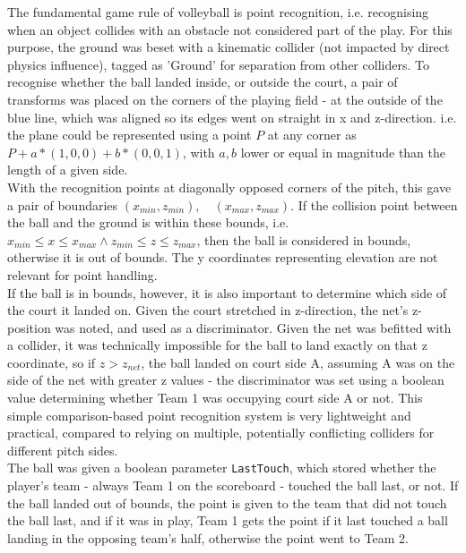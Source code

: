 The fundamental game rule of volleyball is point recognition, i.e. recognising when an object collides with an obstacle not considered part of the play. For this purpose, the ground was beset with a kinematic collider (not impacted by direct physics influence), tagged as 'Ground' for separation from other colliders. To recognise whether the ball landed inside, or outside the court, a pair of transforms was placed on the corners of the playing field - at the outside of the blue line, which was aligned so its edges went on straight in x and z-direction. i.e. the plane could be represented using a point $P$ at any corner as $P + a*(1, 0, 0) + b*(0, 0, 1)$, with $a, b$ lower or equal in magnitude than the length of a given side.\\
With the recognition points at diagonally opposed corners of the pitch, this gave a pair of boundaries $(x_{min}, z_{min}),\quad(x_{max}, z_{max})$. If the collision point between the ball and the ground is within these bounds, i.e. $x_{min} \leq x \leq x_{max} \wedge z_{min} \leq z \leq z_{max}$, then the ball is considered in bounds, otherwise it is out of bounds. The y coordinates representing elevation are not relevant for point handling.\\

If the ball is in bounds, however, it is also important to determine which side of the court it landed on. Given the court stretched in z-direction, the net's z-position was noted, and used as a discriminator. Given the net was befitted with a collider, it was technically impossible for the ball to land exactly on that z coordinate, so if $z > z_{net}$, the ball landed on court side A, assuming A was on the side of the net with greater z values - the discriminator was set using a boolean value determining whether Team 1 was occupying court side A or not. This simple comparison-based point recognition system is very lightweight and practical, compared to relying on multiple, potentially conflicting colliders for different pitch sides.\\

The ball was given a boolean parameter \verb|LastTouch|, which stored whether the player's team - always Team 1 on the scoreboard - touched the ball last, or not. If the ball landed out of bounds, the point is given to the team that did not touch the ball last, and if it was in play, Team 1 gets the point if it last touched a ball landing in the opposing team's half, otherwise the point went to Team 2.\\

